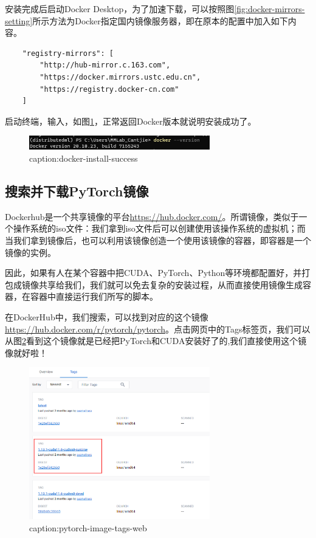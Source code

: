 安装完成后启动Docker Desktop，为了加速下载，可以按照图\ref{fig:docker-mirrors-setting}所示方法为Docker指定国内镜像服务器，即在原本的配置中加入如下内容。
\begin{lstlisting}
    "registry-mirrors": [
        "http://hub-mirror.c.163.com",
        "https://docker.mirrors.ustc.edu.cn",
        "https://registry.docker-cn.com"
    ]
\end{lstlisting}

启动终端，输入，如图\ref{fig:docker-install-success}，正常返回Docker版本就说明安装成功了。
\begin{figure}[htbp]
	\centering
	\includegraphics[width=0.7\textwidth]{figures/docker-install-success.png}
	\caption{caption:docker-install-success}
	\label{fig:docker-install-success}
\end{figure}


\subsection{搜索并下载PyTorch镜像}

Dockerhub是一个共享镜像的平台\url{https://hub.docker.com/}。所谓镜像，类似于一个操作系统的iso文件：我们拿到iso文件后可以创建使用该操作系统的虚拟机；而当我们拿到镜像后，也可以利用该镜像创造一个使用该镜像的容器，即容器是一个镜像的实例。

因此，如果有人在某个容器中把CUDA、PyTorch、Python等环境都配置好，并打包成镜像共享给我们，我们就可以免去复杂的安装过程，从而直接使用镜像生成容器，在容器中直接运行我们所写的脚本。

在DockerHub中，我们搜索，可以找到对应的这个镜像\url{https://hub.docker.com/r/pytorch/pytorch}。点击网页中的Tags标签页，我们可以从图\ref{fig:pytorch-image-tags-web}看到这个镜像就是已经把PyTorch和CUDA安装好了的,我们直接使用这个镜像就好啦！

\begin{figure}[htbp]
	\centering
	\includegraphics[width=0.7\textwidth]{figures/pytorch-image-tags-web.png}
	\caption{caption:pytorch-image-tags-web}
	\label{fig:pytorch-image-tags-web}
\end{figure}

